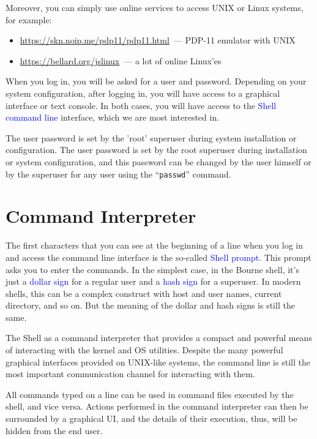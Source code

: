 \documentclass[12pt]{report}
\newcommand{\struct}[1]{\textcolor{blue}{#1}}
\begin{document}
\medskip
Moreover, you can simply use online services to access UNIX or Linux
systems, for example:
\begin{itemize}
\item \href{https://skn.noip.me/pdp11/pdp11.html}%
      {\url{https://skn.noip.me/pdp11/pdp11.html}}~--- PDP-11 emulator with UNIX
\item \href{https://bellard.org/jslinux}{\url{https://bellard.org/jslinux}}~---
      a lot of online Linux'es
\end{itemize}

\medskip
When you log in, you will be asked for a user and password. Depending on
your system configuration, after logging in, you will have access to
a graphical interface or text console. In both cases, you will have access
to the \struct{Shell command line} interface, which we are most interested in.

\medskip
The user password is set by the 'root' superuser during system
installation or configuration. The user password is set by the root
superuser during installation or system configuration, and this password
can be changed by the user himself or by the superuser for any user using
the ``\verb|passwd|'' command.

\section*{Command Interpreter}

\medskip
The first characters that you can see at the beginning of a line when you log in
and access the command line interface is the so-called \struct{Shell prompt}.
This prompt asks you to enter the commands. In the simplest case,
in the Bourne shell, it's just a \struct{dollar sign} for a regular user and
a \struct{hash sign} for a superuser. In modern shells, this can be a complex
construct with host and user names, current directory, and so on.
But the meaning of the dollar and hash signs is still the same.

\medskip
The Shell as a command interpreter that provides a compact and powerful means of
interacting with the kernel and OS utilities. Despite the many powerful
graphical interfaces provided on UNIX-like systems, the command line is still
the most important communication channel for interacting with them.

\medskip
All commands typed on a line can be used in command files executed by the shell,
and vice versa. Actions performed in the command interpreter can then be
surrounded by a graphical UI, and the details of their execution,
thus, will be hidden from the end user.
\end{document}
